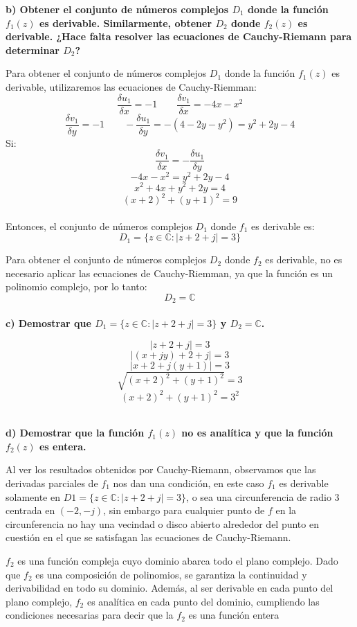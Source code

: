 \documentclass[12pt,a4paper]{report}
\begin{document}
\textbf{b) Obtener el conjunto de números complejos $D_1$ donde la función $f_1(z)$ es derivable. Similarmente, obtener $D_2$ donde $f_2(z)$ es derivable.
¿Hace falta resolver las ecuaciones de Cauchy-Riemann para determinar $D_2$?}

Para obtener el conjunto de números complejos $D_1$ donde la función $f_1(z)$ es derivable, utilizaremos las ecuaciones de Cauchy-Riemman:
$$\frac{\delta u_1}{\delta x}=-1 \quad \quad \frac{\delta v_1}{\delta x}=-4x-x^2$$
$$\frac{\delta v_1}{\delta y}=-1 \quad \quad - \frac{\delta u_1}{\delta y}=-(4-2y-y^2)=y^2+2y-4$$
Si:$$\frac{\delta v_1}{\delta x}=-\frac{\delta u_1}{\delta y}$$
$$-4x-x^2=y^2+2y-4$$
$$x^2+4x+y^2+2y=4$$
$$(x+2)^2+(y+1)^2=9$$\\
Entonces, el conjunto de números complejos $D_1$ donde $f_1$ es derivable es:
$$D_1 = \{z \in \mathbb{C} : |z + 2 + j| = 3\}$$

Para obtener el conjunto de números complejos $D_2$ donde $f_2$ es derivable, no es necesario aplicar las ecuaciones de Cauchy-Riemman,
ya que la función es un polinomio complejo, por lo tanto:
$$D_2=\mathbb{C}$$\\

\textbf{c) Demostrar que $D_1 = \{z \in \mathbb{C} : |z + 2 + j| = 3\}$ y $D_2 = \mathbb{C}$.}

$$|z+2+j|=3$$
$$|(x+jy)+2+j|=3$$
$$|x+2+j(y+1)|=3$$
$$\sqrt{(x+2)^2+(y+1)^2}=3$$
$$(x+2)^2+(y+1)^2=3^2$$\\

\begin{samepage}
\textbf{d) Demostrar que la función $f_1(z)$ no es analítica y que la función $f_2(z)$ es entera.}

\nopagebreak
Al ver los resultados obtenidos por Cauchy-Riemann, observamos que las derivadas parciales de $f_1$ nos dan una condición, en este caso $f_1$ es derivable solamente
en $D1 = \{z \in \mathbb{C} : |z + 2 + j| = 3\}$, o sea una circunferencia de radio $3$ centrada en $(-2, -j)$, sin embargo para cualquier punto de $f$ en la
circunferencia no hay una vecindad o disco abierto alrededor del punto en cuestión en el que se satisfagan las ecuaciones de Cauchy-Riemann.

\nopagebreak
$f_2$ es una función compleja cuyo dominio abarca todo el plano complejo. Dado que $f_2$ es una composición de polinomios, se garantiza la continuidad y
derivabilidad en todo su dominio. Además, al ser derivable en cada punto del plano complejo, $f_2$ es analítica en cada punto del dominio, cumpliendo las
condiciones necesarias para decir que la $f_2$ es una función entera\\
\end{samepage}
\end{document}
